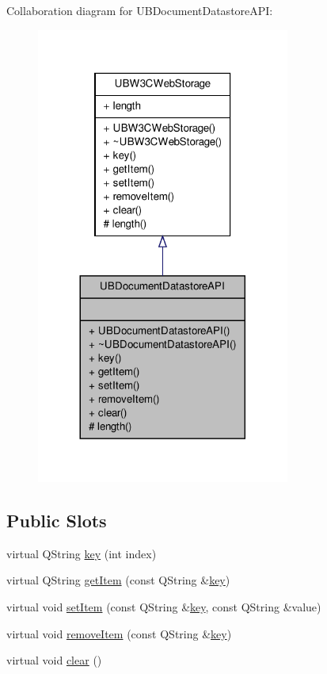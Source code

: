 Collaboration diagram for U\-B\-Document\-Datastore\-A\-P\-I\-:
\nopagebreak
\begin{figure}[H]
\begin{center}
\leavevmode
\includegraphics[width=236pt]{db/d5c/class_u_b_document_datastore_a_p_i__coll__graph}
\end{center}
\end{figure}
\subsection*{Public Slots}
\begin{DoxyCompactItemize}
\item 
virtual Q\-String \hyperlink{class_u_b_document_datastore_a_p_i_a54533b8da730d1d9f2807e4f08321c9d}{key} (int index)
\item 
virtual Q\-String \hyperlink{class_u_b_document_datastore_a_p_i_acd5de33585ba0cb768823d9fa6daee78}{get\-Item} (const Q\-String \&\hyperlink{class_u_b_document_datastore_a_p_i_a54533b8da730d1d9f2807e4f08321c9d}{key})
\item 
virtual void \hyperlink{class_u_b_document_datastore_a_p_i_a4c030e84ad9deeecca59bda73f662c9f}{set\-Item} (const Q\-String \&\hyperlink{class_u_b_document_datastore_a_p_i_a54533b8da730d1d9f2807e4f08321c9d}{key}, const Q\-String \&value)
\item 
virtual void \hyperlink{class_u_b_document_datastore_a_p_i_a9a5d28cd39f1eb8875f14be8e2a1e942}{remove\-Item} (const Q\-String \&\hyperlink{class_u_b_document_datastore_a_p_i_a54533b8da730d1d9f2807e4f08321c9d}{key})
\item 
virtual void \hyperlink{class_u_b_document_datastore_a_p_i_aafcf2ed0ffceb5890d62d392ed7a7d89}{clear} ()
\end{DoxyCompactItemize}
